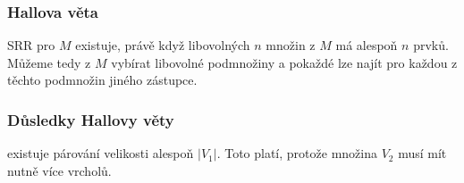 \subsubsection{Hallova věta}

SRR pro $M$ existuje, právě když libovolných $n$ množin z $M$ má alespoň $n$ prvků.
Můžeme tedy z $M$ vybírat libovolné podmnožiny a pokaždé lze najít pro každou z těchto podmnožin jiného zástupce.

\subsubsection{Důsledky Hallovy věty}

 existuje párování velikosti alespoň $|V_1|$.
Toto platí, protože množina $V_2$ musí mít nutně více vrcholů.